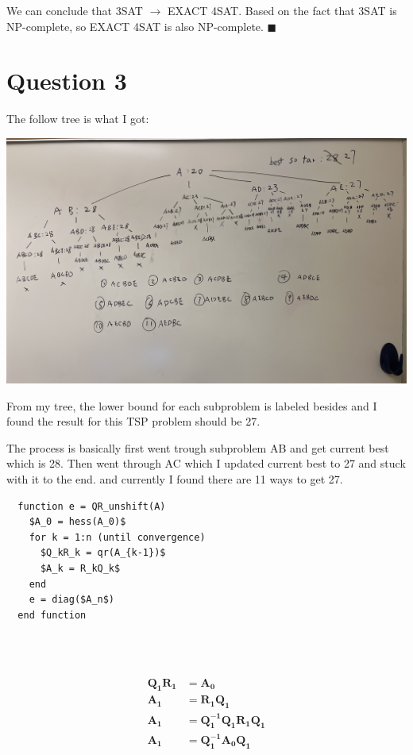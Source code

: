 \documentclass{article}
\newcommand{\mat}[1]{\mathbf{#1}}
\begin{document}
We can conclude that 3SAT $\rightarrow$ EXACT 4SAT. Based on the fact that 3SAT is NP-complete,
so EXACT 4SAT is also NP-complete. $\blacksquare$






\section*{Question 3}
The follow tree is what I got:
\begin{center}
  \includegraphics[scale = 0.1]{trees.jpeg}
\end{center}

From my tree, the lower bound for each subproblem is labeled besides and I found the result for
this TSP problem should be 27. 

The process is basically first went trough subproblem AB and get current best which is 28. Then went through AC which I updated current best to 27 and stuck with it to the end.
and currently I found there are 11 ways to get 27.



\begin{lstlisting}
  function e = QR_unshift(A)
    $A_0 = hess(A_0)$
    for k = 1:n (until convergence)
      $Q_kR_k = qr(A_{k-1})$
      $A_k = R_kQ_k$
    end
    e = diag($A_n$)
  end function 

\end{lstlisting}



\begin{lstlisting}
  
  
\end{lstlisting}

\begin{align}
  \mat{Q_1}\mat{R_1} &= \mat{A_0} \nonumber \\
  \mat{A_1} &= \mat{R_1}\mat{Q_1} \nonumber \\
  \mat{A_1} &= \mat{Q_1^{-1}}\mat{Q_1}\mat{R_1}\mat{Q_1} \nonumber \\
  \mat{A_1} &= \mat{Q_1^{-1}}\mat{A_0}\mat{Q_1} \nonumber \\
\end{align}
\end{document}
